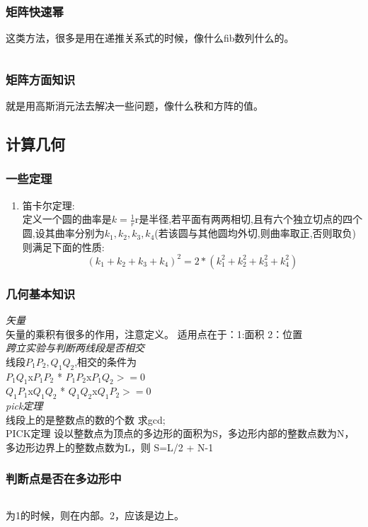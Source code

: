 \documentclass[a4paper,13.6pt]{article}
\begin{document}
\begin{CJK}{UTF8}{gbsn}
\subsubsection{矩阵快速幂}
这类方法，很多是用在递推关系式的时候，像什么fib数列什么的。
\inputminted{c++}{../scoure/math/ju_quick.cpp}
\subsubsection{矩阵方面知识}
就是用高斯消元法去解决一些问题，像什么秩和方阵的值。
\subsection{计算几何}
\subsubsection{一些定理}
\begin{enumerate} %
    \item 笛卡尔定理: \\
    定义一个圆的曲率是$k = \frac{1}{r}$r是半径,若平面有两两相切,且有六个独立切点的四个圆,设其曲率分别为$k_1,k_2,k_3,k_4$(若该圆与其他圆均外切,则曲率取正,否则取负)则满足下面的性质:
    $$(k_1+k_2+k_3+k_4)^2 = 2*(k_1^2+k_2^2+k_3^2+k_4^2)$$
\end{enumerate}
\subsubsection{几何基本知识}
\emph{矢量}\\
矢量的乘积有很多的作用，注意定义。
适用点在于：1:面积 2：位置\\
\emph{跨立实验与判断两线段是否相交}\\
线段$P_1P_2,Q_1Q_2$,相交的条件为\\
$P_1Q_1$x$P_1P_2$  *  $P_1P_2$x$P_1Q_2>=0$\\
$Q_1P_1$x$Q_1Q_2$  *  $Q_1Q_2$x$Q_1P_2>=0$\\
\emph{pick定理}\\
线段上的是整数点的数的个数 求gcd;\\
PICK定理 设以整数点为顶点的多边形的面积为S，多边形内部的整数点数为N，多边形边界上的整数点数为L，则 S=L/2 + N-1

\subsubsection{判断点是否在多边形中}
\inputminted{c++}{../scoure/math/jihe.cpp}
为1的时候，则在内部。2，应该是边上。

\end{CJK}
\end{document}
